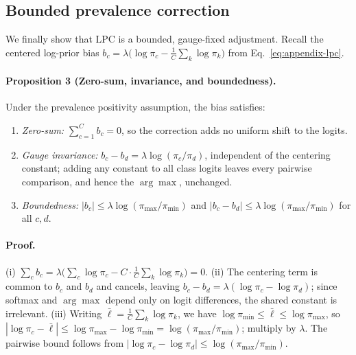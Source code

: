 \documentclass[letterpaper]{article}
\theoremstyle{definition}
\theoremstyle{plain}
\begin{document}
\subsection{Bounded prevalence correction}
\label{app:theory-lpc}

We finally show that LPC is a bounded, gauge-fixed adjustment. Recall the centered log-prior bias $b_c=\lambda\big(\log\pi_c-\tfrac1C\sum_k\log\pi_k\big)$ from Eq.~\ref{eq:appendix-lpc}.

\paragraph{Proposition 3 (Zero-sum, invariance, and boundedness).}
\label{prop:lpc}
Under the prevalence positivity assumption, the bias satisfies:
\begin{enumerate}
\item[(i)] \emph{Zero-sum:} $\sum_{c=1}^{C}b_c=0$, so the correction adds no uniform shift to the logits.
\item[(ii)] \emph{Gauge invariance:} $b_c-b_d=\lambda\log(\pi_c/\pi_d)$, independent of the centering constant; adding any constant to all class logits leaves every pairwise comparison, and hence the $\arg\max$, unchanged.
\item[(iii)] \emph{Boundedness:} $|b_c|\le\lambda\log(\pi_{\max}/\pi_{\min})$ and $|b_c-b_d|\le\lambda\log(\pi_{\max}/\pi_{\min})$ for all $c,d$.
\end{enumerate}

\paragraph{Proof.}
(i) $\sum_c b_c=\lambda\big(\sum_c\log\pi_c-C\cdot\tfrac1C\sum_k\log\pi_k\big)=0$.
(ii) The centering term is common to $b_c$ and $b_d$ and cancels, leaving $b_c-b_d=\lambda(\log\pi_c-\log\pi_d)$; since softmax and $\arg\max$ depend only on logit differences, the shared constant is irrelevant.
(iii) Writing $\bar\ell=\tfrac1C\sum_k\log\pi_k$, we have $\log\pi_{\min}\le\bar\ell\le\log\pi_{\max}$, so $|\log\pi_c-\bar\ell|\le\log\pi_{\max}-\log\pi_{\min}=\log(\pi_{\max}/\pi_{\min})$; multiply by $\lambda$. The pairwise bound follows from $|\log\pi_c-\log\pi_d|\le\log(\pi_{\max}/\pi_{\min})$.
\end{document}
